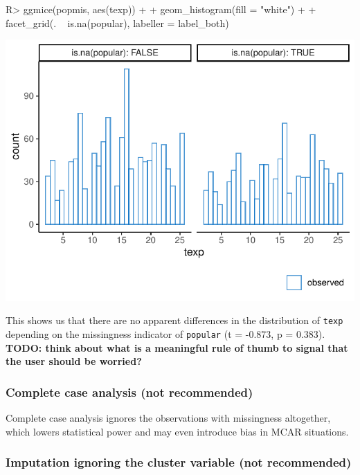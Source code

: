 \documentclass[
]{jss}
\begin{document}
\begin{CodeChunk}
\begin{CodeInput}
R> ggmice(popmis, aes(texp)) +
+   geom_histogram(fill = "white") +
+   facet_grid(. ~ is.na(popular), labeller = label_both)
\end{CodeInput}


\begin{center}\includegraphics{Imputation_of_Incomplete_Multilevel_Data_files/figure-latex/pop-hist-1} \end{center}

\end{CodeChunk}

This shows us that there are no apparent differences in the distribution
of \texttt{texp} depending on the missingness indicator of
\texttt{popular} (t = -0.873, p = 0.383). \textbf{TODO: think about what
is a meaningful rule of thumb to signal that the user should be
worried?}

\hypertarget{complete-case-analysis-not-recommended}{%
\subsubsection{Complete case analysis (not
recommended)}\label{complete-case-analysis-not-recommended}}

Complete case analysis ignores the observations with missingness
altogether, which lowers statistical power and may even introduce bias
in MCAR situations.

\hypertarget{imputation-ignoring-the-cluster-variable-not-recommended}{%
\subsubsection{Imputation ignoring the cluster variable (not
recommended)}\label{imputation-ignoring-the-cluster-variable-not-recommended}}
\end{document}
